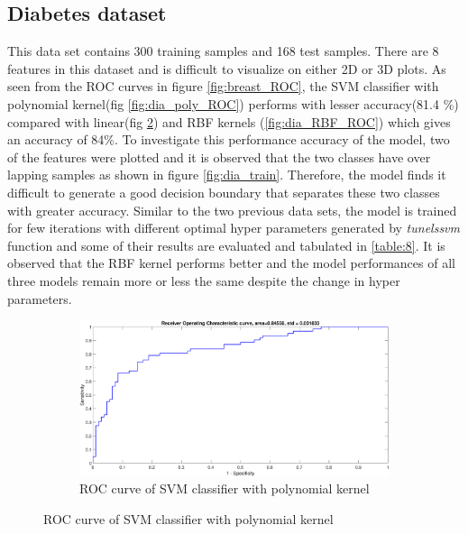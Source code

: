 {\subsection{Diabetes dataset}
This data set contains   300 training samples and 168  test samples. There are 8 features in this dataset and is difficult to visualize on either 2D or 3D plots. As seen from the ROC curves in figure \ref{fig:breast_ROC}, the SVM classifier with polynomial kernel(fig \ref{fig:dia_poly_ROC}) performs with lesser accuracy(81.4 \%) compared with linear(fig \ref{fig:dia_lin_ROC}) and RBF kernels (\ref{fig:dia_RBF_ROC}) which gives an accuracy of 84\%. To investigate this performance accuracy of the model, two of the features were plotted and it is observed that the two classes have over lapping samples as shown in figure \ref{fig:dia_train}. Therefore, the model finds it difficult to generate a good decision boundary that separates these two classes with greater accuracy. Similar to the two previous data sets, the model is trained for few iterations with different optimal hyper parameters generated by \textit{tunelssvm} function and some of their results are evaluated and tabulated in \ref{table:8}. It is observed that the RBF kernel performs better and
the model performances of all three models remain more or less the same despite the change in hyper parameters. 
\begin{figure}[!ht] 
	\centering
	\begin{subfigure}{.35\textwidth}
		\centering
		\captionsetup{width=0.8\linewidth}
		\includegraphics[height=.65\linewidth, width=0.9\linewidth]{Exercise1/Report/diabetes/dia_lin_ROC.eps}
		\caption{ROC curve of SVM classifier with polynomial kernel}
		\label{fig:dia_lin_ROC}
	\end{subfigure}%

\end{figure}}
